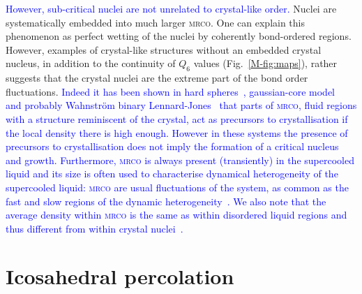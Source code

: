 \documentclass[prl,twocolumn,notitlepage]{revtex4-1}
\begin{document}
\textcolor{blue}{However, sub-critical nuclei are not unrelated to crystal-like order.} Nuclei are systematically embedded into much larger \textsc{mrco}. One can explain this phenomenon as perfect wetting of the nuclei by coherently bond-ordered regions. However, examples of crystal-like structures without an embedded crystal nucleus, in addition to the continuity of $Q_6$ values (Fig.~\ref{M-fig:maps}), rather suggests that the crystal nuclei are the extreme part of the bond order fluctuations. \textcolor{blue}{Indeed it has been shown in hard spheres~\cite{OMalley2005, Schilling2010, Kawasaki2010c, Russo2011}, gaussian-core model~\cite{Russo2012} and probably Wahnstr\"om binary Lennard-Jones~\cite{Pedersen2010} that parts of \textsc{mrco}, fluid regions with a structure reminiscent of the crystal, act as precursors to crystallisation if the local density there is high enough. However in these systems the presence of precursors to crystallisation does not imply the formation of a critical nucleus and growth. Furthermore, \textsc{mrco} is always present (transiently) in the supercooled liquid and its size is often used to characterise dynamical heterogeneity of the supercooled liquid: \textsc{mrco} are usual fluctuations of the system, as common as the fast and slow regions of the dynamic heterogeneity~\cite{tanaka2010critical}. We also note that the average density within \textsc{mrco} is the same as within disordered liquid regions and thus different from within crystal nuclei~\cite{Kawasaki2010c}.}


\section*{Icosahedral percolation}
\end{document}
